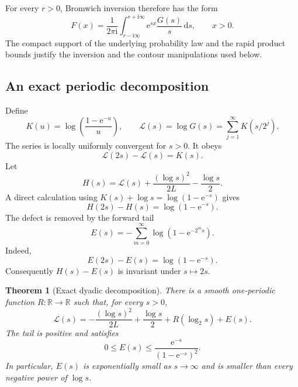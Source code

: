 \documentclass[11pt]{article}
\numberwithin{equation}{section}
\newtheorem{theorem}{Theorem}[section]
\theoremstyle{definition}
\theoremstyle{remark}
\newcommand{\R}{\mathbb{R}}
\newcommand{\dd}{\,\mathrm{d}}
\newcommand{\e}{\mathrm{e}}
\newcommand{\ii}{\mathrm{i}}
\begin{document}
For every $r>0$, Bromwich inversion therefore has the form
\begin{equation}\label{eq:bromwich}
 F(x)=\frac{1}{2\pi\ii}
 \int_{r-\ii\infty}^{r+\ii\infty}
 \e^{sx}\frac{G(s)}s\dd s,
 \qquad x>0.
\end{equation}
The compact support of the underlying probability law and the rapid product
bounds justify the inversion and the contour manipulations used below.

\subsection{An exact periodic decomposition}

Define
\begin{equation}\label{eq:K-Laplace}
 K(u)=\log\left(\frac{1-\e^{-u}}u\right),
 \qquad
 \mathscr L(s)=\log G(s)=\sum_{j=1}^{\infty}K(s/2^j).
\end{equation}
The series is locally uniformly convergent for $s>0$.  It obeys
\begin{equation}\label{eq:L-refinement}
 \mathscr L(2s)-\mathscr L(s)=K(s).
\end{equation}
Let
\begin{equation}\label{eq:H-def}
 H(s)=\mathscr L(s)+\frac{(\log s)^2}{2L}-\frac{\log s}{2}.
\end{equation}
A direct calculation using $K(s)+\log s=\log(1-\e^{-s})$ gives
\begin{equation}\label{eq:H-defect}
 H(2s)-H(s)=\log(1-\e^{-s}).
\end{equation}
The defect is removed by the forward tail
\begin{equation}\label{eq:E-tail}
 E(s)=-\sum_{m=0}^{\infty}\log(1-\e^{-2^ms}).
\end{equation}
Indeed,
\begin{equation}\label{eq:E-defect}
 E(2s)-E(s)=\log(1-\e^{-s}).
\end{equation}
Consequently $H(s)-E(s)$ is invariant under $s\mapsto2s$.

\begin{theorem}[Exact dyadic decomposition]\label{thm:laplace-periodic}
There is a smooth one-periodic function $R:\R\to\R$ such that, for every
$s>0$,
\begin{equation}\label{eq:L-periodic-decomp}
 \mathscr L(s)
 =-\frac{(\log s)^2}{2L}+\frac{\log s}{2}
  +R(\log_2s)+E(s).
\end{equation}
The tail is positive and satisfies
\begin{equation}\label{eq:E-bound}
 0\le E(s)\le\frac{\e^{-s}}{(1-\e^{-s})^2}.
\end{equation}
In particular, $E(s)$ is exponentially small as $s\to\infty$ and is smaller
than every negative power of $\log s$.
\end{theorem}
\end{document}
